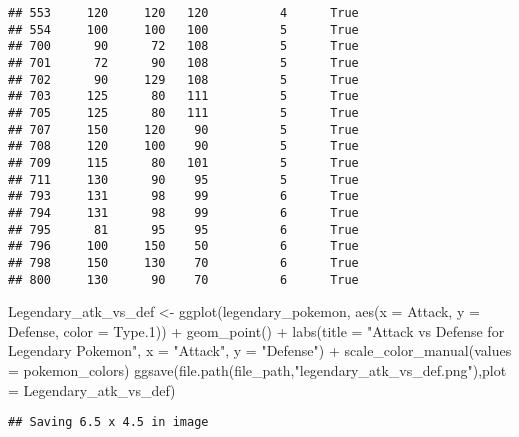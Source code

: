 \documentclass[
]{article}
\newenvironment{Shaded}{\begin{snugshade}}{\end{snugshade}}
\newcommand{\AttributeTok}[1]{\textcolor[rgb]{0.77,0.63,0.00}{#1}}
\newcommand{\FloatTok}[1]{\textcolor[rgb]{0.00,0.00,0.81}{#1}}
\newcommand{\FunctionTok}[1]{\textcolor[rgb]{0.00,0.00,0.00}{#1}}
\newcommand{\NormalTok}[1]{#1}
\newcommand{\OtherTok}[1]{\textcolor[rgb]{0.56,0.35,0.01}{#1}}
\newcommand{\SpecialCharTok}[1]{\textcolor[rgb]{0.00,0.00,0.00}{#1}}
\newcommand{\StringTok}[1]{\textcolor[rgb]{0.31,0.60,0.02}{#1}}
\begin{document}
\begin{verbatim}
## 553     120     120   120          4      True
## 554     100     100   100          5      True
## 700      90      72   108          5      True
## 701      72      90   108          5      True
## 702      90     129   108          5      True
## 703     125      80   111          5      True
## 705     125      80   111          5      True
## 707     150     120    90          5      True
## 708     120     100    90          5      True
## 709     115      80   101          5      True
## 711     130      90    95          5      True
## 793     131      98    99          6      True
## 794     131      98    99          6      True
## 795      81      95    95          6      True
## 796     100     150    50          6      True
## 798     150     130    70          6      True
## 800     130      90    70          6      True
\end{verbatim}

\begin{Shaded}
\begin{Highlighting}[]
\NormalTok{Legendary\_atk\_vs\_def }\OtherTok{\textless{}{-}} \FunctionTok{ggplot}\NormalTok{(legendary\_pokemon, }\FunctionTok{aes}\NormalTok{(}\AttributeTok{x =}\NormalTok{ Attack, }\AttributeTok{y =}\NormalTok{ Defense, }\AttributeTok{color =}\NormalTok{ Type}\FloatTok{.1}\NormalTok{)) }\SpecialCharTok{+} 
  \FunctionTok{geom\_point}\NormalTok{() }\SpecialCharTok{+}
  \FunctionTok{labs}\NormalTok{(}\AttributeTok{title =} \StringTok{"Attack vs Defense for Legendary Pokemon"}\NormalTok{, }
       \AttributeTok{x =} \StringTok{"Attack"}\NormalTok{, }\AttributeTok{y =} \StringTok{"Defense"}\NormalTok{) }\SpecialCharTok{+}
   \FunctionTok{scale\_color\_manual}\NormalTok{(}\AttributeTok{values =}\NormalTok{ pokemon\_colors)}
\FunctionTok{ggsave}\NormalTok{(}\FunctionTok{file.path}\NormalTok{(file\_path,}\StringTok{"legendary\_atk\_vs\_def.png"}\NormalTok{),}\AttributeTok{plot =}\NormalTok{ Legendary\_atk\_vs\_def)}
\end{Highlighting}
\end{Shaded}

\begin{verbatim}
## Saving 6.5 x 4.5 in image
\end{verbatim}
\end{document}
